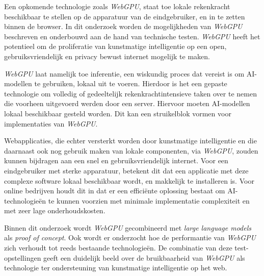 \bigbreak{}

Een opkomende technologie zoals \textit{WebGPU}, staat toe lokale rekenkracht beschikbaar te stellen op de apparatuur van de eindgebruiker, en in te zetten binnen de browser. In dit onderzoek worden de mogelijkheden van \textit{WebGPU} beschreven en onderbouwd aan de hand van technische testen. \textit{WebGPU} heeft het potentieel om de proliferatie van kunstmatige intelligentie op een open, gebruiksvriendelijk en privacy bewust internet mogelijk te maken.

\bigbreak{}

\textit{WebGPU} laat namelijk toe inferentie, een wiskundig proces dat vereist is om AI-modellen te gebruiken, lokaal uit te voeren. Hierdoor is het een gepaste technologie om volledig of gedeeltelijk rekenkrachtintensieve taken over te nemen die voorheen uitgevoerd werden door een server. Hiervoor moeten AI-modellen lokaal beschikbaar gesteld worden. Dit kan een struikelblok vormen voor implementaties van \textit{WebGPU}.

\bigbreak{}

Webapplicaties, die echter versterkt worden door kunstmatige intelligentie en die daarnaast ook nog gebruik maken van lokale componenten, via \textit{WebGPU}, zouden kunnen bijdragen aan een snel en gebruiksvriendelijk internet. Voor een eindgebruiker met sterke apparatuur, betekent dit dat een applicatie met deze complexe software lokaal beschikbaar wordt, en makkelijk te installeren is. Voor online bedrijven houdt dit in dat er een efficiënte oplossing bestaat om AI-tech\-no\-lo\-gieën te kunnen voorzien met minimale implementatie complexiteit en met zeer lage onderhoudskosten.

\bigbreak{}

Binnen dit onderzoek wordt \textit{WebGPU} gecombineerd met \textit{large language models} als \textit{proof of concept}. Ook wordt er onderzocht hoe de performantie van \textit{WebGPU} zich verhoudt tot reeds bestaande technologieën. De combinatie van deze test-op\-ste\-llingen geeft een duidelijk beeld over de bruikbaarheid van \textit{WebGPU} als technologie ter ondersteuning van kunstmatige intelligentie op het web.